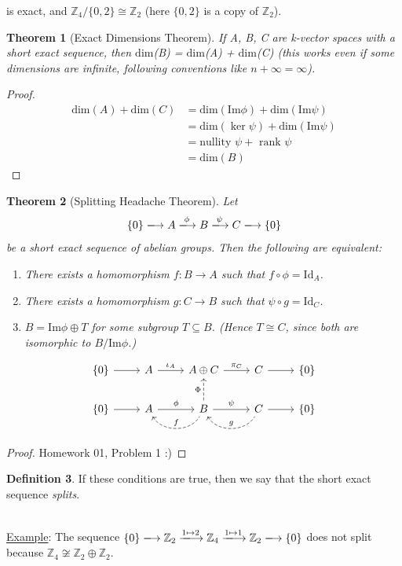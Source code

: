 \documentclass[12pt]{article}
\newcommand{\z}{\mathbb{Z}}
\newcommand{\ita}[1]{\textit{#1}}
\newtheorem{theorem}{Theorem}[section]
\theoremstyle{definition}
\newtheorem{definition}[theorem]{Definition}
\begin{document}
is exact, and $\z_4/\{0,2\}\cong\z_2$ (here $\{0,2\}$ is a copy of $\z_2$).
\begin{theorem}[Exact Dimensions Theorem]
    If A, B, C are k-vector spaces with a short exact sequence, then $\mathrm{dim}$(B) = $\mathrm{dim}$(A) + $\mathrm{dim}$(C) (this works even if some dimensions are infinite, following conventions like $n+\infty=\infty$).
\end{theorem}
\begin{proof}
    \begin{equation*}
        \begin{split}
            \text{dim}(A)+\text{dim}(C)&=\text{dim}(\text{Im}\phi)+\text{dim}(\text{Im}\psi)\\
            &=\text{dim}(\ker\psi)+\text{dim}(\text{Im}\psi)\\
            &=\text{nullity }\psi+\text{ rank }\psi\\
            &=\text{dim}(B)
        \end{split}
    \end{equation*}
\end{proof}
\begin{theorem}[Splitting Headache Theorem]
     Let 
    \begin{equation}
        \{0\}\xlongrightarrow{} A\xlongrightarrow{\phi}B\xlongrightarrow{\psi}C\xlongrightarrow{}\{0\}
    \end{equation}
    be a short exact sequence of abelian groups. Then the following are equivalent:
    \begin{enumerate}
        \item There exists a homomorphism $f:B\to A$ such that $f\circ\phi=\text{Id}_A$.
        \item There exists a homomorphism $g:C\to B$ such that $\psi\circ g=\text{Id}_C$.
        \item $B=\text{Im}\phi\oplus T$ for some subgroup $T\subseteq B$. (Hence $T\cong C$, since both are isomorphic to $B/\text{Im}\phi$.)
    \end{enumerate}
\end{theorem}
{\[\begin{tikzcd}
\{0\}\arrow[r] & A\arrow[r,"\iota_A"]  & A\oplus C\arrow[r,"\pi_C"] & C\arrow[r] & \{0\}\\
\{0\}\arrow[r] &  A\arrow[r,"\phi"]\arrow[r,dashleftarrow, "f", bend right=60] & B\arrow[r,"\psi"]\arrow[u,dashrightarrow, "\Phi"]\arrow[r,dashleftarrow, "g", bend right=60] & C\arrow[r] & \{0\}
\end{tikzcd} \]\Large}
\begin{proof}
    Homework 01, Problem 1 :)
\end{proof}
\begin{definition}
If these conditions are true, then we say that the short exact sequence \ita{splits}.
\end{definition}$ $\\
\underline{Example}: The sequence $\{0\}\xlongrightarrow{}\z_2\xlongrightarrow{1\mapsto2}\z_4\xlongrightarrow{1\mapsto1}\z_2\xlongrightarrow{}\{0\}$ does not split because $\z_4\not\cong\z_2\oplus\z_2$.
\end{document}
